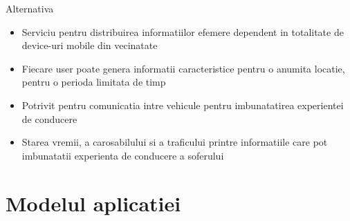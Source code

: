 \documentclass{beamer}
\begin{document}
\begin{frame}{Alternativa}
	\begin{itemize}
	  \item Serviciu pentru distribuirea informatiilor efemere dependent in
	  totalitate de device-uri mobile din vecinatate
	  \item Fiecare user poate genera informatii caracteristice pentru o anumita
	  locatie, pentru o perioda limitata de timp
	  \item Potrivit pentru comunicatia intre vehicule pentru imbunatatirea
	  experientei de conducere
	  \item Starea vremii, a carosabilului si a traficului printre informatiile
	  care pot imbunatatii experienta de conducere a soferului
	\end{itemize}
\end{frame}

\section{Modelul aplicatiei}
\end{document}
